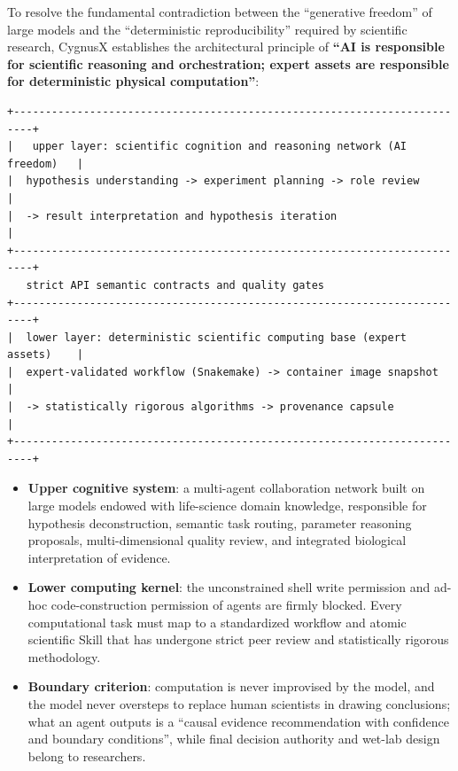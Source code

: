 \documentclass[11pt,a4paper]{article}
\begin{document}
To resolve the fundamental contradiction between the ``generative freedom'' of large models and the ``deterministic reproducibility'' required by scientific research, CygnusX establishes the architectural principle of \textbf{``AI is responsible for scientific reasoning and orchestration; expert assets are responsible for deterministic physical computation''}:

\begin{verbatim}
+-------------------------------------------------------------------------+
|   upper layer: scientific cognition and reasoning network (AI freedom)   |
|  hypothesis understanding -> experiment planning -> role review         |
|  -> result interpretation and hypothesis iteration                       |
+-------------------------------------------------------------------------+
   strict API semantic contracts and quality gates
+-------------------------------------------------------------------------+
|  lower layer: deterministic scientific computing base (expert assets)    |
|  expert-validated workflow (Snakemake) -> container image snapshot       |
|  -> statistically rigorous algorithms -> provenance capsule             |
+-------------------------------------------------------------------------+
\end{verbatim}

\begin{itemize}
  \item \textbf{Upper cognitive system}: a multi-agent collaboration network built on large models endowed with life-science domain knowledge, responsible for hypothesis deconstruction, semantic task routing, parameter reasoning proposals, multi-dimensional quality review, and integrated biological interpretation of evidence.
  \item \textbf{Lower computing kernel}: the unconstrained shell write permission and ad-hoc code-construction permission of agents are firmly blocked. Every computational task must map to a standardized workflow and atomic scientific Skill that has undergone strict peer review and statistically rigorous methodology.
  \item \textbf{Boundary criterion}: computation is never improvised by the model, and the model never oversteps to replace human scientists in drawing conclusions; what an agent outputs is a ``causal evidence recommendation with confidence and boundary conditions'', while final decision authority and wet-lab design belong to researchers.
\end{itemize}
\end{document}
